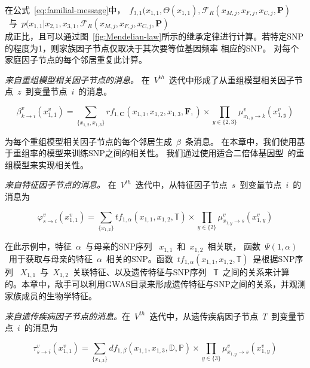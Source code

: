 在公式~\ref{eq:familial-message}中，~$f_{3,1}(x_{1,1},\Theta(x_{1,1}),\mathcal{F}_{R}(x_{M,j},x_{F,j}, x_{C,j},\mathbf{P})$~与~$p(x_{1,1}| x_{2,1},x_{3,1},\mathcal{F}_{R}(x_{M,j},x_{F,j}, x_{C,j},\mathbf{P})~$\\成正比，且可以通过图~\ref{fig:Mendelian-law}所示的继承定律进行计算。若特定SNP的程度为1，则家族因子节点仅取决于其次要等位基因频率 相应的SNP。 对每个家庭因子节点的每个邻居重复此计算。


\emph{来自重组模型相关因子节点的消息。} 在~$V^{th}$~迭代中形成了从重组模型相关因子节点~$z$~到变量节点~$i$~的消息。

\begin{equation}\label{eq:relavtes-information}
\beta_{k \rightarrow i}^v(x_{1,1}^v) = \sum_{\{x_{1,2},x_{1,3}\}}rf_{1,\mathbf{C}}(x_{1,1},x_{1,2},x_{1,3},\mathbf{F},) \times  \prod_{y \in \{2,3\}} \mu_{x_{1,y} \rightarrow k}^v(x_{1,y}^v)
\end{equation}

为每个重组模型相关因子节点的每个邻居生成~$\beta$~条消息。 在本章中，我们使用基于重组率的模型来训练SNP之间的相关性。 我们通过使用适合二倍体基因型~\cite{marchini2007newa}的重组模型来实现相关性。

\emph{来自特征因子节点的消息。} 在~$V^{th}$~迭代中，从特征因子节点~$s$~到变量节点~$i$~的消息为

\begin{equation}
\label{eq:trait-message}
\varphi_{s \rightarrow i}^v(x_{1,1}^v) =  \sum_{\{x_{1,2}\}}tf_{1,\alpha}(x_{1,1},x_{1,2},\mathbb{T}) \times  \prod_{y \in \{2\}} \mu_{x_{1,y} \rightarrow s}^v(x_{1,y}^v)
\end{equation}

在此示例中，特征~$\alpha$~与母亲的SNP序列 ~$x_{1,1}$~和~$x_{1,2}$~相关联，
 函数~$\Psi(1,\alpha)$~用于获取与母亲的特征~$\alpha$~相关的SNP。函数~$tf_{1,\alpha}(x_{1,1},x_{1,2},\mathbb{T})$~是根据SNP序列 ~$X_{1,1}$~与~$X_{1,2}$~关联特征、以及遗传特征与SNP序列 ~$\mathbb{T}$~之间的关系来计算的。本章中，敌手可以利用GWAS目录来形成遗传特征与SNP之间的关系，并观测家族成员的生物学特征。

\emph{来自遗传疾病因子节点的消息。}在~$V^{th}$~迭代中，从遗传疾病因子节点~$T$~到变量节点~$i$~的消息为

\begin{equation}
\label{eq:disease-messages}
\tau_{s \rightarrow i}^v(x_{1,1}^v) =  \sum_{\{x_{1,3}\}}df_{1,\beta}(x_{1,1},x_{1,3},\mathbb{D},\mathbb{P}) \times  \prod_{y \in \{3\}} \mu_{x_{1,y} \rightarrow s}^v(x_{1,y}^v)
\end{equation}

